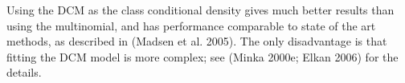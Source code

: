 Using the DCM as the class conditional density gives much better results than using the multinomial, and has performance comparable to state of the art methods, as described in (Madsen et al. 2005). The only disadvantage is that fitting the DCM model is more complex; see (Minka 2000e; Elkan 2006) for the details.
